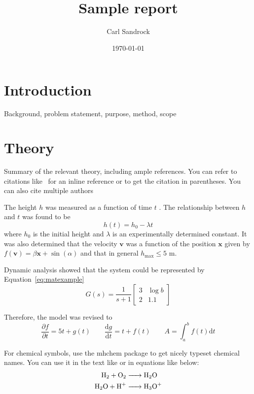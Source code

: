 \documentclass[a4paper,12pt]{article}
\title{Sample report}
\author{Carl Sandrock}
\date{\today}
\newcommand{\nomunit}[1]{%
\renewcommand{\nomentryend}{\hspace*{\fill}\si{#1}}}
\begin{document}


\section{Introduction}
Background, problem statement, purpose, method, scope

\section{Theory}
Summary of the relevant theory, including ample references. You can refer to citations like~\textcite{bruckmanmandersloot} for an inline reference or \parencite{bruckmanmandersloot} to get the citation in parentheses. You can also cite multiple authors~\parencite{mandersloot,bruckmanmandersloot}

The height $h$ \nomenclature{h}{Height\nomunit{m}} was measured as a function of time $t$ \nomenclature{t}{Time\nomunit{s}}.  The relationship between $h$ and $t$ was found to be 
\begin{equation}
  \label{eq:commaexample}
  h(t) = h_0 - \lambda t
\end{equation}
where $h_0$ is the initial height and $\lambda$ is an experimentally
determined constant.  It was also determined that the velocity
$\mathbf{v}$ was a function of the position $\mathbf{x}$ given by
$f(\mathbf{v}) = \beta \mathbf{x} + \sin(\alpha)$ and that in general
$h_{\mathrm{max}} \leq 5$ m.

Dynamic analysis showed that the system could be represented by
Equation~\ref{eq:matexample}
\begin{equation}
  \label{eq:matexample}
  G(s) = \frac{1}{s+1}\left [ 
    \begin{array}{cc} 
      3 & \log{b} \\ 
      2 & \num{1.1} 
    \end{array} \right ]
\end{equation}

Therefore, the model was revised to
\begin{equation}
  \frac{\partial f}{\partial t} = 5t + g(t) \qquad \frac{\mathrm{d} g}{\mathrm{d} t} = t + f(t) \qquad A = \int_a^b f(t) \mathrm{d} t
\end{equation}

For chemical symbols, use the mhchem package to get nicely typeset chemical
names. You can use it in the text like  or in equations like below:
\begin{align}
  \label{eq:chemexample}
  \ce{H2 + O2 &-> H2O} \\
  \ce{H2O + H+ &-> H3O+}
\end{align}
\end{document}
